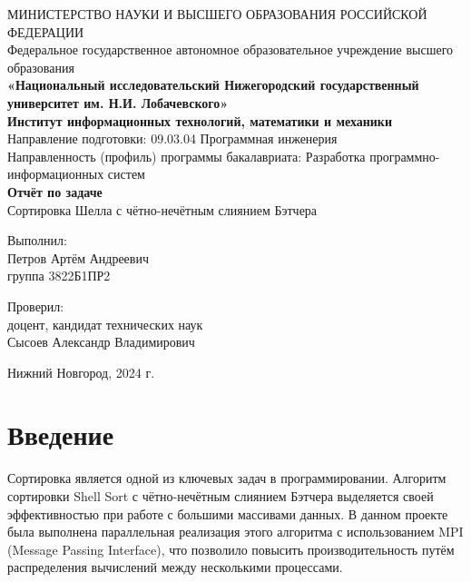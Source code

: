 \documentclass[a4paper,12pt]{article}
\begin{document}
\begin{centering}
\thispagestyle{empty}
МИНИСТЕРСТВО НАУКИ И ВЫСШЕГО ОБРАЗОВАНИЯ РОССИЙСКОЙ ФЕДЕРАЦИИ\\
Федеральное государственное автономное образовательное учреждение высшего образования\\
    {\bfseries\large «Национальный исследовательский Нижегородский государственный университет им. Н.И. Лобачевского»}\\
    {\bfseries\large Институт информационных технологий, математики и механики}\\
Направление подготовки: 09.03.04 Программная инженерия\\
Направленность (профиль) программы бакалавриата: Разработка программно-информационных систем\\

    \vspace{6cm} 
    {\LARGE\bfseries Отчёт по задаче}\\
    {\large Сортировка Шелла с чётно-нечётным слиянием Бэтчера}\\
    \vspace{6cm} 

    {\hfill\parbox{0.5\textwidth}{%
        Выполнил:\\
        Петров Артём Андреевич\\
        группа 3822Б1ПР2\\

        \vspace{0.1cm}

        Проверил:\\
        доцент, кандидат технических наук\\
        Сысоев Александр Владимирович}
    }
    \vspace{2cm} 

    Нижний Новгород, 2024 г.

\end{centering}

\tableofcontents
\newpage

\section{Введение}
Сортировка является одной из ключевых задач в программировании. Алгоритм сортировки Shell Sort с чётно-нечётным слиянием Бэтчера выделяется своей эффективностью при работе с большими массивами данных. В данном проекте была выполнена параллельная реализация этого алгоритма с использованием MPI (Message Passing Interface), что позволило повысить производительность путём распределения вычислений между несколькими процессами.
\end{document}
